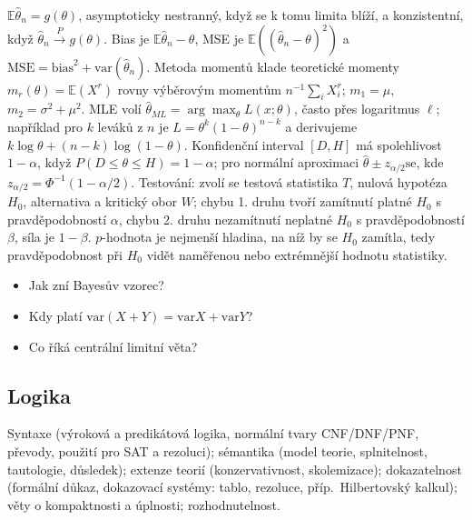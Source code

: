 \begin{odpoved}
$\mathbb E\hat\theta_n=g(\theta)$, asymptoticky nestranný, když se k tomu limita blíží,
a konzistentní, když $\hat\theta_n\xrightarrow P g(\theta)$. Bias je
$\mathbb E\hat\theta_n-\theta$, MSE je $\mathbb E((\hat\theta_n-\theta)^2)$ a
$\mathrm{MSE}=\mathrm{bias}^2+\mathrm{var}(\hat\theta_n)$. Metoda momentů klade
teoretické momenty $m_r(\theta)=\mathbb E(X^r)$ rovny výběrovým momentům
$n^{-1}\sum_iX_i^r$; $m_1=\mu$, $m_2=\sigma^2+\mu^2$. MLE volí
$\hat\theta_{ML}=\arg\max_\theta L(x;\theta)$, často přes logaritmus $\ell$; například
pro $k$ leváků z $n$ je $L=\theta^k(1-\theta)^{n-k}$ a derivujeme
$k\log\theta+(n-k)\log(1-\theta)$. Konfidenční interval $[D,H]$ má spolehlivost
$1-\alpha$, když $P(D\le\theta\le H)=1-\alpha$; pro normální aproximaci
$\hat\theta\pm z_{\alpha/2}\mathrm{se}$, kde $z_{\alpha/2}=\Phi^{-1}(1-\alpha/2)$.
Testování: zvolí se testová statistika $T$, nulová hypotéza $H_0$, alternativa a kritický
obor $W$; chybu 1. druhu tvoří zamítnutí platné $H_0$ s pravděpodobností $\alpha$,
chybu 2. druhu nezamítnutí neplatné $H_0$ s pravděpodobností $\beta$, síla je $1-\beta$.
$p$-hodnota je nejmenší hladina, na níž by se $H_0$ zamítla, tedy pravděpodobnost při
$H_0$ vidět naměřenou nebo extrémnější hodnotu statistiky.
\end{odpoved}
\begin{recall}
\begin{itemize}[leftmargin=1.2em,itemsep=0pt,topsep=1pt]
  \item Jak zní Bayesův vzorec?
  \item Kdy platí $\mathrm{var}(X+Y)=\mathrm{var}X+\mathrm{var}Y$?
  \item Co říká centrální limitní věta?
\end{itemize}
\end{recall}

\subsection{Logika}

\begin{tema}
Syntaxe (výroková a predikátová logika, normální tvary CNF/DNF/PNF, převody, použití pro SAT
a rezoluci); sémantika (model teorie, splnitelnost, tautologie, důsledek); extenze teorií
(konzervativnost, skolemizace); dokazatelnost (formální důkaz, dokazovací systémy: tablo,
rezoluce, příp.\ Hilbertovský kalkul); věty o kompaktnosti a úplnosti; rozhodnutelnost.
\end{tema}
\begin{vezkratce}
\end{vezkratce}

